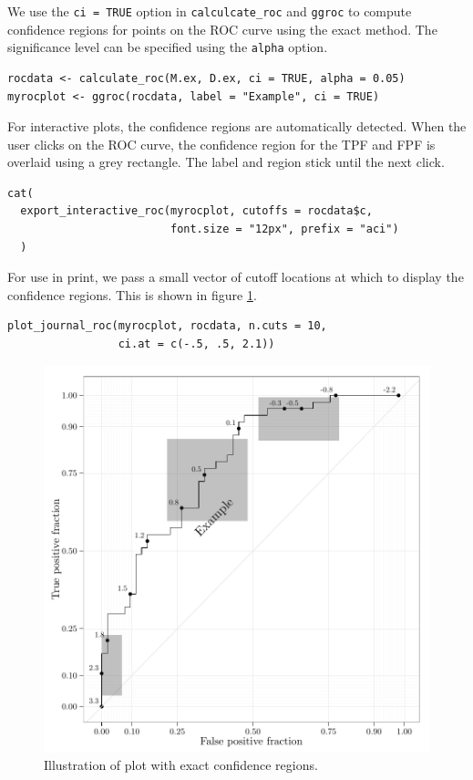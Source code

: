 \documentclass[article]{jss}
\begin{document}
We use the \texttt{ci = TRUE} option in \texttt{calculcate\_roc} and
\texttt{ggroc} to compute confidence regions for points on the ROC curve
using the \citet{clopper1934use} exact method. The significance level
can be specified using the \texttt{alpha} option.

\begin{verbatim}
rocdata <- calculate_roc(M.ex, D.ex, ci = TRUE, alpha = 0.05)
myrocplot <- ggroc(rocdata, label = "Example", ci = TRUE)
\end{verbatim}

For interactive plots, the confidence regions are automatically
detected. When the user clicks on the ROC curve, the confidence region
for the TPF and FPF is overlaid using a grey rectangle. The label and
region stick until the next click.

\begin{verbatim}
cat(
  export_interactive_roc(myrocplot, cutoffs = rocdata$c, 
                         font.size = "12px", prefix = "aci")
  )
\end{verbatim}

For use in print, we pass a small vector of cutoff locations at which to
display the confidence regions. This is shown in figure \ref{conf}.

\begin{verbatim}
plot_journal_roc(myrocplot, rocdata, n.cuts = 10, 
                 ci.at = c(-.5, .5, 2.1))
\end{verbatim}

\begin{figure}[htbp]
\centering
\includegraphics{figure/printci-1.pdf}
\caption{Illustration of  plot with exact confidence
regions. \label{conf}}
\end{figure}
\end{document}
